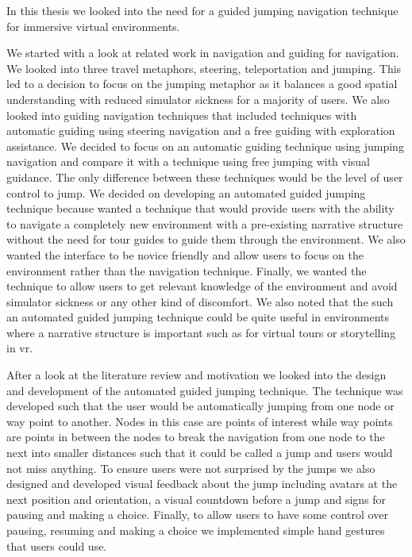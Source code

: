 \label{Chapter:Conclusion and Future Work}
In this thesis we looked into the need for a guided jumping navigation technique for immersive virtual environments.

We started with a look at related work in navigation and guiding for navigation. We looked into three travel metaphors, steering, teleportation and jumping. This led to a decision to focus on the jumping metaphor as it balances a good spatial understanding with reduced simulator sickness for a majority of users. We also looked into guiding navigation techniques that included techniques with automatic guiding using steering navigation and a free guiding with exploration assistance. We decided to focus on an automatic guiding technique using jumping navigation and compare it with a technique using free jumping with visual guidance. The only difference between these techniques would be the level of user control to jump. We decided on developing an automated guided jumping technique because wanted a technique that would provide users with the ability to navigate a completely new environment with a pre-existing narrative structure without the need for tour guides to guide them through the environment. We also wanted the interface to be novice friendly and allow users to focus on the environment rather than the navigation technique. Finally, we wanted the technique to allow users to get relevant knowledge of the environment and avoid simulator sickness or any other kind of discomfort. We also noted that the such an automated guided jumping technique could be quite useful in environments where a narrative structure is important such as for virtual tours or storytelling in \acrshort{vr}.

After a look at the literature review and motivation we looked into the design and development of the automated guided jumping technique. The technique was developed such that the user would be automatically jumping from one node or way point to another. Nodes in this case are points of interest while way points are points in between the nodes to break the navigation from one node to the next into smaller distances such that it could be called a jump and users would not miss anything. To ensure users were not surprised by the jumps we also designed and developed visual feedback about the jump including avatars at the next position and orientation, a visual countdown before a jump and signs for pausing and making a choice. Finally, to allow users to have some control over pausing, resuming and making a choice we implemented simple hand gestures that users could use.

